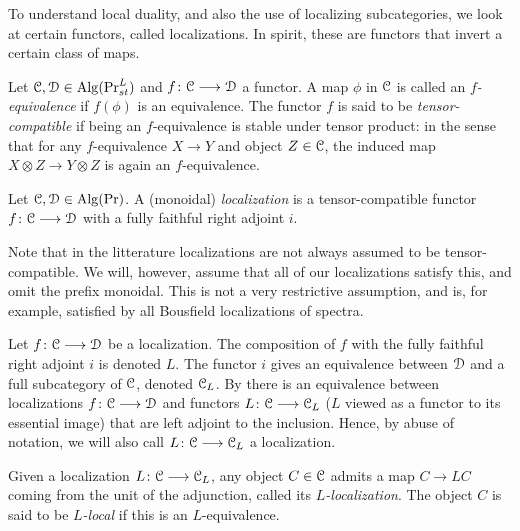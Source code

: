To understand local duality, and also the use of localizing subcategories, we look at certain functors, called localizations. In spirit, these are functors that invert a certain class of maps. 

\begin{definition}
    \label{ch0:def:L-equivalence}
    Let $\EuScript{C}, \EuScript{D}\in \operatorname{Alg}(\mathrm{Pr}_{st}^L)$ and $f\colon \EuScript{C}\longrightarrow \EuScript{D}$ a functor. A map $\phi$ in $\EuScript{C}$ is called an \emph{$f$-equivalence} if $f(\phi)$ is an equivalence. The functor $f$ is said to be \emph{tensor-compatible} if being an $f$-equivalence is stable under tensor product: in the sense that for any $f$-equivalence $X\longrightarrow Y$ and object $Z\in \EuScript{C}$, the induced map $X\otimes Z\longrightarrow Y\otimes Z$ is again an $f$-equivalence. 
\end{definition}

\begin{definition}
    \label{ch0:def:localization}
    Let $\EuScript{C}, \EuScript{D}\in \operatorname{Alg}(\Pr)$. A (monoidal) \emph{localization} is a tensor-compatible functor $f\colon \EuScript{C}\longrightarrow \EuScript{D}$ with a fully faithful right adjoint $i$. 
\end{definition}

\begin{remark}
    \label{ch0:rm:localizations-tensor-compatible}
    Note that in the litterature localizations are not always assumed to be tensor-compatible. We will, however, assume that all of our localizations satisfy this, and omit the prefix monoidal. This is not a very restrictive assumption, and is, for example, satisfied by all Bousfield localizations of spectra. 
\end{remark}

\begin{remark}
    Let $f\colon \EuScript{C}\longrightarrow \EuScript{D}$ be a localization. The composition of $f$ with the fully faithful right adjoint $i$ is denoted $L$. The functor $i$ gives an equivalence between $\EuScript{D}$ and a full subcategory of $\EuScript{C}$, denoted $\EuScript{C}_L$. By \cite[5.2.7.4]{lurie_09} there is an equivalence between localizations $f\colon \EuScript{C}\longrightarrow \EuScript{D}$ and functors $L\colon \EuScript{C}\longrightarrow \EuScript{C}_L$ ($L$ viewed as a functor to its essential image) that are left adjoint to the inclusion. Hence, by abuse of notation, we will also call $L\colon \EuScript{C}\longrightarrow \EuScript{C}_L$ a localization. 
\end{remark}

\begin{definition}
    Given a localization $L\colon \EuScript{C}\longrightarrow \EuScript{C}_L$, any object $C\in \EuScript{C}$ admits a map $C\longrightarrow LC$ coming from the unit of the adjunction, called its \emph{$L$-localization}. The object $C$ is said to be \emph{$L$-local} if this is an $L$-equivalence. 
\end{definition}

